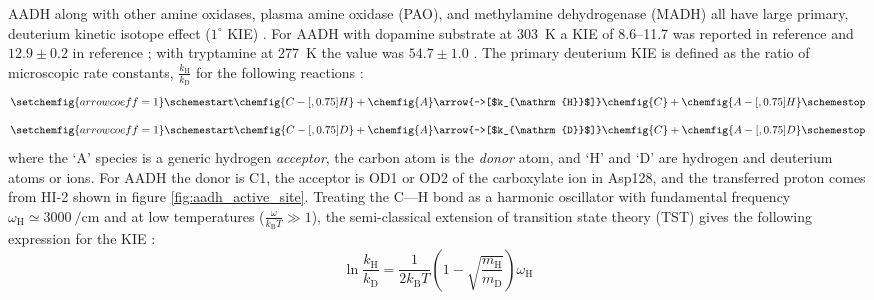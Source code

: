 AADH along with other amine oxidases, plasma amine oxidase (PAO), and methylamine dehydrogenase (MADH) all have large primary, deuterium kinetic isotope effect ($\mathrm{1}^{\circ}$ KIE) \cite{hyunUnusuallyLargeIsotope1995a}. For AADH with dopamine substrate at \SI{303}{\kelvin} a KIE of \numrange[range-phrase=\text{--}]{8.6}{11.7} was reported in reference \cite{hyunUnusuallyLargeIsotope1995a} and $\num{12.9} \pm \num{0.2}$ in reference \cite{basranImportanceBarrierShape2001a}; with tryptamine at \SI{277}{\kelvin} the value was $\num{54.7}\pm\num{1.0}$ \cite{basranImportanceBarrierShape2001a}. The primary deuterium KIE is defined as the ratio of microscopic rate constants, $\frac{k_{\mathrm{H}}}{k_{\mathrm{D}}}$ for the following reactions \cite{bisswanger2017enzyme}: 
\begin{equation}
\setchemfig{arrow coeff=1}
\schemestart
    \chemfig{C-[,0.75]H} + \chemfig{A}
    \arrow{->[$k_{\mathrm{H}}$]}
    \chemfig{C} + \chemfig{A-[,0.75]H}
\schemestop
\end{equation}
\begin{equation}
\setchemfig{arrow coeff=1}
\schemestart
    \chemfig{C-[,0.75]D} + \chemfig{A}
    \arrow{->[$k_{\mathrm{D}}$]}
    \chemfig{C} + \chemfig{A-[,0.75]D}
\schemestop
\end{equation}
where the `A' species is a generic hydrogen \emph{acceptor}, the carbon atom is the \emph{donor} atom, and `H' and `D' are hydrogen and deuterium atoms or ions. For AADH the donor is C1, the acceptor is OD1 or OD2 of the carboxylate ion in Asp128, and the transferred proton comes from HI-2 shown in figure \ref{fig:aadh_active_site}. Treating the C---H bond as a harmonic oscillator with fundamental frequency $\omega_{\mathrm{H}} \simeq \SI{3000}{\per\centi\meter}$ and at low temperatures ($\frac{\omega}{k_{\mathrm{B}}T} \gg 1$), the semi-classical extension of transition state theory (TST) gives the following expression for the KIE \cite{antoniouLargeKineticIsotope1997}:
\begin{equation}\label{eqn:tst_kie}
\ln \frac{k_{\mathrm{H}}}{k_{\mathrm{D}}}=\frac{1}{2k_{\mathrm{B}}T}\left(1-\sqrt{\frac{m_{\mathrm{H}}}{m_{\mathrm{D}}}}\right) \omega_{\mathrm{H}}
\end{equation}
